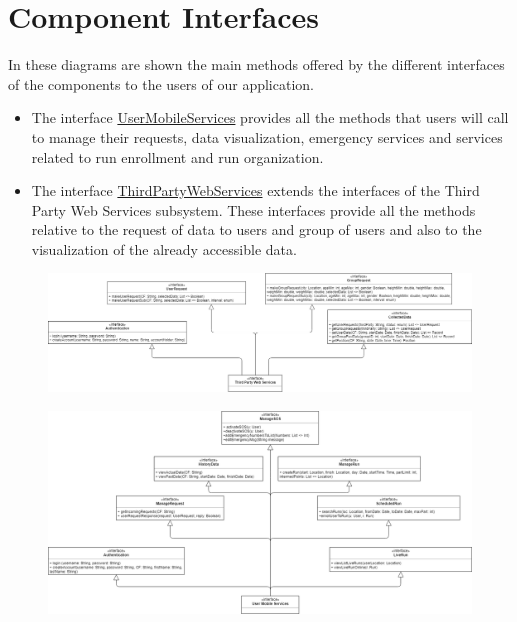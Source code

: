 \section{Component Interfaces}
In these diagrams are shown the main methods offered by the different interfaces of the components to the users of our application.

\begin{itemize}
    \item  The interface \underline{UserMobileServices} provides all the methods that users will call to manage their requests, data visualization, emergency services and services related to run enrollment and run organization.
    \item The interface \underline{ThirdPartyWebServices} extends the interfaces of the Third Party Web Services subsystem. These interfaces provide all the methods relative to the request of data to users and group of users and also to the visualization of the already accessible data.
   \end{itemize}

\begin{figure}[H]
    \centering
    \includegraphics[scale=0.32]{DD/Pictures/compInterfDiagThirdPDD.png}
   
\end{figure}

\begin{figure}[H]
    \centering
    \includegraphics[scale=0.35]{DD/Pictures/compInterfDiagUserDD.png}
   
\end{figure}